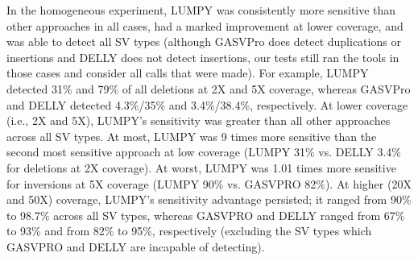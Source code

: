 \documentclass[10pt]{bmc_article}
\def\texttt{[image: ]}
\newenvironment{bmcformat}{\begin{raggedright}\baselineskip20pt\sloppy\setboolean{publ}{false}}{\end{raggedright}\baselineskip20pt\sloppy}
\begin{document}
\begin{bmcformat}
In the homogeneous experiment, LUMPY was consistently more sensitive than other
approaches in all cases, had a marked improvement at lower coverage, and was
able to detect all SV types (although GASVPro does detect duplications or
insertions and DELLY does not detect insertions, our tests still ran the tools
in those cases and consider all calls that were made).  For example, LUMPY
detected 31\% and 79\% of all deletions at 2X and 5X coverage, whereas GASVPro
and DELLY detected 4.3\%/35\% and 3.4\%/38.4\%, respectively.  At lower coverage
(i.e., 2X and 5X), LUMPY’s sensitivity was greater than all other approaches
across all SV types. At most, LUMPY was 9 times more sensitive than the second
most sensitive approach at low coverage (LUMPY 31\% vs. DELLY 3.4\% for
deletions at 2X coverage). At worst, LUMPY was 1.01 times more sensitive for
inversions at 5X coverage (LUMPY 90\% vs.  GASVPRO 82\%). At higher (20X and
50X) coverage, LUMPY’s sensitivity advantage persisted; it ranged from 90\% to
98.7\% across all SV types, whereas GASVPRO and DELLY ranged from 67\% to 93\%
and from 82\% to 95\%, respectively (excluding the SV types which GASVPRO and
DELLY are incapable of detecting).  





\end{bmcformat}
\end{document}
